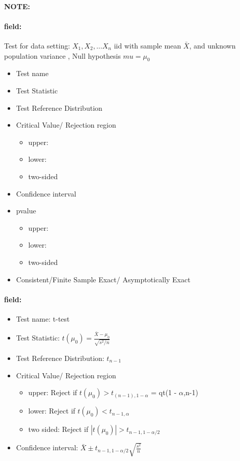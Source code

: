 \documentclass[12pt]{article}
\newenvironment{note}{\paragraph{NOTE:}}{}
\newenvironment{field}{\paragraph{field:}}{}
\begin{document}
\begin{note}
 \begin{field}
  Test for data setting: $X_1, X_2, \ldots X_n$ iid with sample mean $\bar{X}$, and unknown population variance , Null hypothesis $mu = \mu_0$
  \begin{itemize}
   \item Test name
   \item Test Statistic
   \item Test Reference Distribution
   \item Critical Value/ Rejection region
         \begin{itemize}
          \item upper:
          \item lower:
          \item two-sided
         \end{itemize}
   \item Confidence interval
   \item pvalue
         \begin{itemize}
          \item upper:
          \item lower:
          \item two-sided
         \end{itemize}
   \item Consistent/Finite Sample Exact/ Asymptotically Exact
  \end{itemize}
 \end{field}
 \begin{field}
  \begin{itemize}
   \item Test name: t-test
   \item Test Statistic: $t(\mu_0) = \frac{\bar{X} - \mu_0}{\sqrt{s^2/n}}$
   \item Test Reference Distribution: $t_{n-1}$
   \item Critical Value/ Rejection region
         \begin{itemize}
          \item upper: Reject if $t(\mu_0) > t_{(n-1),1-\alpha}$ = qt(1 - $\alpha$,n-1)
          \item lower: Reject if $t(\mu_0)  < t_{n-1,\alpha}$
          \item two sided: Reject if $|t(\mu_0)| > t_{n-1, 1 - \alpha/2}$
         \end{itemize}
   \item Confidence interval: $\bar{X} \pm t_{n-1,1-\alpha/2}\sqrt{\frac{s^2}{n}}$

\end{itemize}
\end{field}
\end{note}
\end{document}
